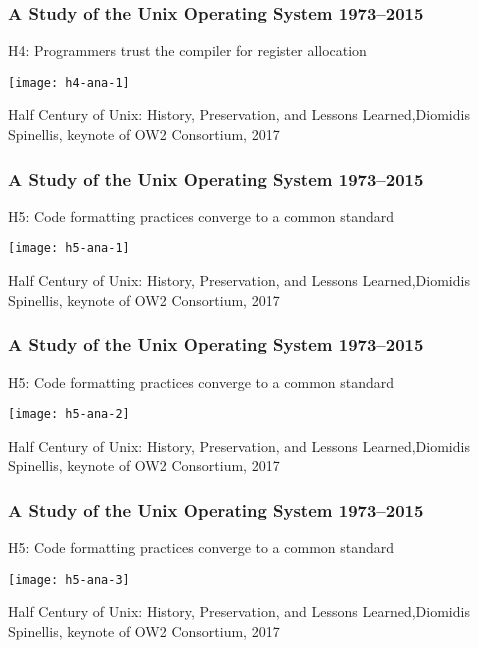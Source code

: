 \begin{frame}[plain]
	\frametitle{A Study of the Unix Operating System 1973–2015}
	\centering
	H4: Programmers trust the compiler
	for register allocation
	
	\texttt{[image: h4-ana-1]}
	
	\tiny Half Century of Unix:
	History, Preservation, and
	Lessons Learned,Diomidis Spinellis, keynote of OW2 Consortium, 2017
	
\end{frame}	

\begin{frame}[plain]
	\frametitle{A Study of the Unix Operating System 1973–2015}
	\centering
	H5: Code formatting practices
	converge to a common standard
	
	
	\texttt{[image: h5-ana-1]}
	
	\tiny Half Century of Unix:
	History, Preservation, and
	Lessons Learned,Diomidis Spinellis, keynote of OW2 Consortium, 2017
	
\end{frame}	

\begin{frame}[plain]
	\frametitle{A Study of the Unix Operating System 1973–2015}
	\centering
	H5: Code formatting practices
	converge to a common standard
	
	
	\texttt{[image: h5-ana-2]}
	
	\tiny Half Century of Unix:
	History, Preservation, and
	Lessons Learned,Diomidis Spinellis, keynote of OW2 Consortium, 2017
	
\end{frame}	


\begin{frame}[plain]
	\frametitle{A Study of the Unix Operating System 1973–2015}
	\centering
	H5: Code formatting practices
	converge to a common standard
	
	
	\texttt{[image: h5-ana-3]}
	
	\tiny Half Century of Unix:
	History, Preservation, and
	Lessons Learned,Diomidis Spinellis, keynote of OW2 Consortium, 2017
	
\end{frame}	




